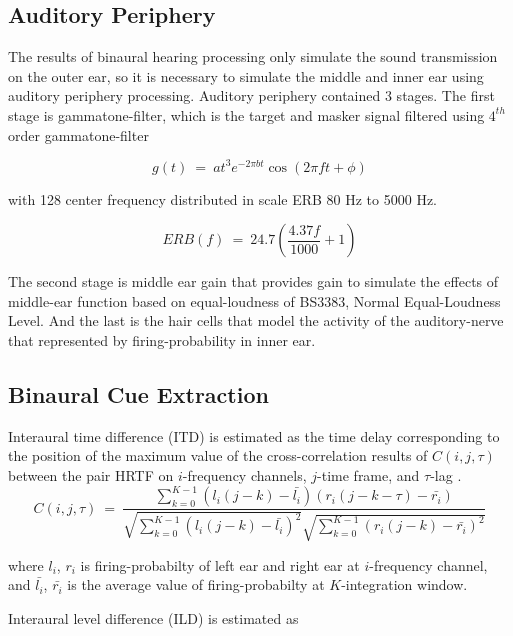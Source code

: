 \documentclass[a4paper]{jpconf}
\begin{document}
\subsection{Auditory Periphery}
The results of binaural hearing processing only simulate the sound transmission on the outer ear, so it is necessary to simulate the middle and inner ear using auditory periphery processing. Auditory periphery contained 3 stages. The first stage is gammatone-filter, which is the target and masker signal filtered using $4^{th}$order gammatone-filter 

\begin{equation}\label{pers:gammatone}
g(t) ~=~ at^{3}e^{-2\pi bt}\cos(2 \pi ft + \phi)
\end{equation}

with 128 center frequency distributed in scale ERB 80 Hz to 5000 Hz\cite{roman2002}.

\begin{equation}\label{pers:erb}
ERB(f) ~=~ 24.7 \left( \frac{4.37 f}{1000} + 1\right)
\end{equation}

The second stage is middle ear gain that provides gain to simulate the effects of middle-ear function based on equal-loudness of BS3383, Normal Equal-Loudness Level. And the last is the hair cells that model the activity of the auditory-nerve that represented by firing-probability in inner ear\cite{meddis1986}.

\subsection{Binaural Cue Extraction}
Interaural time difference (ITD) is estimated as the time delay corresponding to the position of the maximum value of the cross-correlation results of $C(i, j, \tau)$ between the pair HRTF on $i$-frequency channels, $j$-time frame, and $\tau$-lag \cite{jeffress1948}.
\begin{equation}\label{pers:itd}
C(i, j, \tau) ~=~ \frac{\sum_{k=0}^{K-1}(l_i(j-k)-\bar{l_i})(r_i(j-k-\tau)-\bar{r_i})}{\sqrt{\sum_{k=0}^{K-1}(l_i(j-k)-\bar{l_i})^2}\sqrt{\sum_{k=0}^{K-1}(r_i(j-k)-\bar{r_i})^2}}
\end{equation}

where $l_i$, $r_i$ is firing-probabilty of left ear and right ear at $i$-frequency channel, and $\bar{l_i}$, $\bar{r_i}$ is the average value of firing-probabilty at $K$-integration window.

Interaural level difference (ILD) is estimated as
\end{document}
